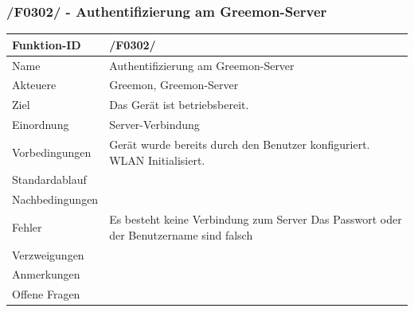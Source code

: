 \documentclass[pointlessnumbers]{scrartcl}
\begin{document}
 \subsubsection{/F0302/ - Authentifizierung am Greemon-Server}
 \begin{tabular}{|p{\BreiteErsterTab}|p{\BreiteZweiterTab}|}\hline
    Funktion-ID &        /F0302/  
                        \\ \hline
    Name &               Authentifizierung am Greemon-Server
                        \\ \hline
    Akteuere &           Greemon, Greemon-Server
                        \\ \hline
    Ziel &               Das Gerät ist betriebsbereit. 
                        \\ \hline
    Einordnung &        Server-Verbindung
                        \\ \hline
    Vorbedingungen &    Gerät wurde bereits durch den Benutzer konfiguriert.
                        WLAN Initialisiert.
                        \\ \hline
    Standardablauf &    
                        \\ \hline
    Nachbedingungen &   
                        \\ \hline
    Fehler &            Es besteht keine Verbindung zum Server 
                        Das Passwort oder der Benutzername sind falsch
                        \\ \hline
    Verzweigungen &     
                        \\ \hline
    Anmerkungen &       
                        \\ \hline
    Offene Fragen &     
                        \\ \hline
 \end{tabular} 
 
\end{document}

